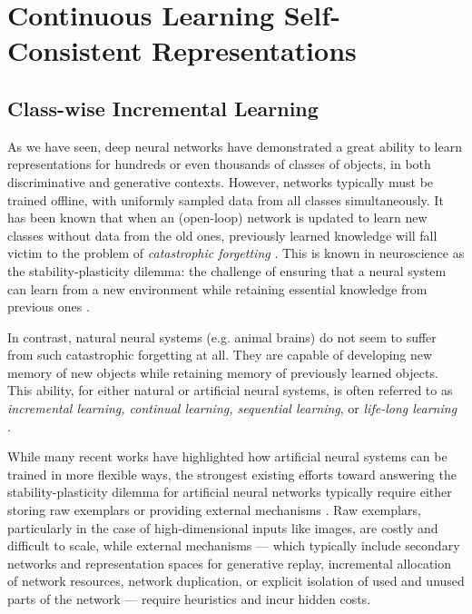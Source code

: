 \documentclass[\toplevelprefix/book-main.tex]{subfiles}
\begin{document}
\section{Continuous Learning Self-Consistent Representations}
\label{sec:continuous}

\subsection{Class-wise Incremental Learning}
\label{sec:class-wise-incremental}

As we have seen, deep neural networks have demonstrated a great ability to learn representations for hundreds or even thousands of classes of objects, in both discriminative and generative contexts. However, networks typically must be trained offline, with uniformly sampled data from all classes simultaneously. It has been known that when an (open-loop) network is updated to learn new classes without data from the old ones, previously learned knowledge will fall victim to the problem of {\em catastrophic forgetting} \cite{McCloskey1989catastrophic}. This is known in neuroscience as the stability-plasticity dilemma: the challenge of ensuring that a neural system can learn from a new environment while retaining essential knowledge from previous ones \cite{Grossberg1987CompetitiveLF}.

In contrast, natural neural systems (e.g. animal brains) do not seem to suffer from such catastrophic forgetting at all. They are capable of developing new memory of new objects while retaining memory of previously learned objects. This ability, for either natural or artificial neural systems, is often referred to as {\em  incremental learning, continual learning, sequential learning}, or {\em life-long learning}~ \cite{controlled-forgetting}.



While many recent works have highlighted how artificial neural systems can be  trained in more flexible ways, the strongest existing efforts toward answering the stability-plasticity dilemma for artificial neural networks typically require either storing raw exemplars \cite{icarl,chaudhry2019tiny} or providing external mechanisms \cite{EWC}. Raw exemplars, particularly in the case of high-dimensional inputs like images, are costly and difficult to scale, while external mechanisms --- which typically include secondary networks and representation spaces for generative replay, incremental allocation of network resources, network duplication, or explicit isolation of used and unused parts of the network --- require heuristics and incur hidden costs.
\end{document}
